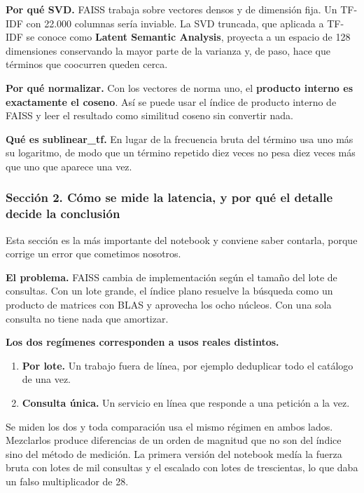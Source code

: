 \documentclass[11pt]{article}
\begin{document}
\textbf{Por qué SVD.} FAISS trabaja sobre vectores densos y de dimensión fija. Un TF-IDF con 22.000 columnas sería inviable. La SVD truncada, que aplicada a TF-IDF se conoce como \textbf{Latent Semantic Analysis}, proyecta a un espacio de 128 dimensiones conservando la mayor parte de la varianza y, de paso, hace que términos que coocurren queden cerca.

\textbf{Por qué normalizar.} Con los vectores de norma uno, el \textbf{producto interno es exactamente el coseno}. Así se puede usar el índice de producto interno de FAISS y leer el resultado como similitud coseno sin convertir nada.

\textbf{Qué es sublinear\_\allowbreak{}tf.} En lugar de la frecuencia bruta del término usa uno más su logaritmo, de modo que un término repetido diez veces no pesa diez veces más que uno que aparece una vez.

\subsubsection*{Sección 2. Cómo se mide la latencia, y por qué el detalle decide la conclusión}
Esta sección es la más importante del notebook y conviene saber contarla, porque corrige un error que cometimos nosotros.

\textbf{El problema.} FAISS cambia de implementación según el tamaño del lote de consultas. Con un lote grande, el índice plano resuelve la búsqueda como un producto de matrices con BLAS y aprovecha los ocho núcleos. Con una sola consulta no tiene nada que amortizar.

\textbf{Los dos regímenes corresponden a usos reales distintos.}

\begin{enumerate}
  \item \textbf{Por lote.} Un trabajo fuera de línea, por ejemplo deduplicar todo el catálogo de una vez.
  \item \textbf{Consulta única.} Un servicio en línea que responde a una petición a la vez.
\end{enumerate}
Se miden los dos y toda comparación usa el mismo régimen en ambos lados. Mezclarlos produce diferencias de un orden de magnitud que no son del índice sino del método de medición. La primera versión del notebook medía la fuerza bruta con lotes de mil consultas y el escalado con lotes de trescientas, lo que daba un falso multiplicador de 28.
\end{document}

